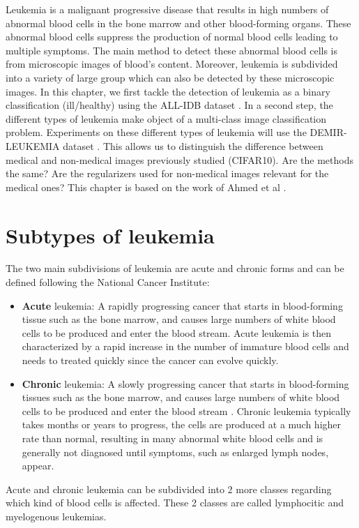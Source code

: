\documentclass[11pt, openany]{report}
\theoremstyle{plain}
\theoremstyle{definition}
\theoremstyle{remark}
\begin{document}
Leukemia is a malignant progressive disease that results in high numbers of abnormal blood cells in the bone marrow and other blood-forming organs. These abnormal blood cells suppress the production of normal blood cells leading to multiple symptoms. The main method to detect these abnormal blood cells is from microscopic images of blood's content. Moreover, leukemia is subdivided into a variety of large group which can also be detected by these microscopic images. In this chapter, we first tackle the detection of leukemia as a binary classification (ill/healthy) using the ALL-IDB dataset \cite{ALL-IDB}. In a second step, the different types of leukemia make object of a multi-class image classification problem. Experiments on these different types of leukemia will use the DEMIR-LEUKEMIA dataset \cite{leukemia}. This allows us to distinguish the difference between medical and non-medical images previously studied (CIFAR10). Are the methods the same? Are the regularizers used for non-medical images relevant for the medical ones? This chapter is based on the work of Ahmed et al \cite{leukemia}. 


\section{Subtypes of leukemia}
The two main subdivisions of leukemia are acute and chronic forms and can be defined following the National Cancer Institute: 
\begin{itemize}
\item \textbf{Acute} leukemia: A rapidly progressing cancer that starts in blood-forming tissue such as the bone marrow, and causes large numbers of white blood cells to be produced and enter the blood stream\cite{NCI}. Acute leukemia is then characterized by a rapid increase in the number of immature blood cells and needs to treated quickly since the cancer can evolve quickly. 
\item \textbf{Chronic} leukemia: A slowly progressing cancer that starts in blood-forming tissues such as the bone marrow, and causes large numbers of white blood cells to be produced and enter the blood stream \cite{NCI}. Chronic leukemia typically takes months or years to progress, the cells are produced at a much higher rate than normal, resulting in many abnormal white blood cells and is generally not diagnosed until symptoms, such as enlarged lymph nodes, appear.
\end{itemize} 

Acute and chronic leukemia can be subdivided into 2 more classes regarding which kind of blood cells is affected. These 2 classes are called lymphocitic and myelogenous leukemias. 
\end{document}
